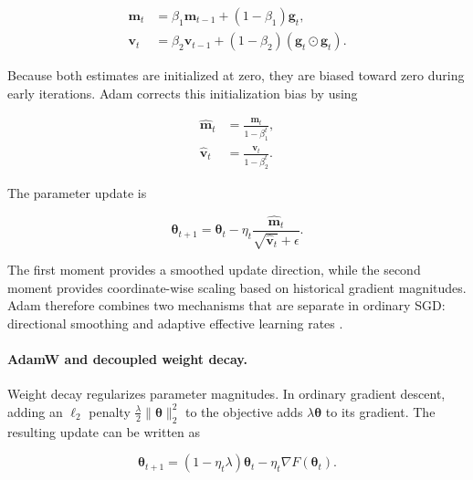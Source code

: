 \begin{align}
    \mathbf{m}_t
    &=
    \beta_1\mathbf{m}_{t-1}
    +(1-\beta_1)\mathbf{g}_t,
    \label{eq:opt-adam-first-moment}\\
    \mathbf{v}_t
    &=
    \beta_2\mathbf{v}_{t-1}
    +(1-\beta_2)(\mathbf{g}_t\odot\mathbf{g}_t).
    \label{eq:opt-adam-second-moment}
\end{align}

Because both estimates are initialized at zero, they are biased toward
zero during early iterations. Adam corrects this initialization bias by
using

\begin{align}
    \widehat{\mathbf{m}}_t
    &=
    \frac{\mathbf{m}_t}{1-\beta_1^t},
    \label{eq:opt-adam-mhat}\\
    \widehat{\mathbf{v}}_t
    &=
    \frac{\mathbf{v}_t}{1-\beta_2^t}.
    \label{eq:opt-adam-vhat}
\end{align}

The parameter update is

\begin{equation}
    \boldsymbol{\theta}_{t+1}
    =
    \boldsymbol{\theta}_t
    -
    \eta_t
    \frac{\widehat{\mathbf{m}}_t}
    {\sqrt{\widehat{\mathbf{v}}_t}+\epsilon}.
    \label{eq:opt-adam-update}
\end{equation}

The first moment provides a smoothed update direction, while the second
moment provides coordinate-wise scaling based on historical gradient
magnitudes. Adam therefore combines two mechanisms that are separate in
ordinary SGD: directional smoothing and adaptive effective learning
rates \parencite{Ranganath2026Navigating}.

\paragraph{AdamW and decoupled weight decay.}
Weight decay regularizes parameter magnitudes. In ordinary gradient
descent, adding an $\ell_2$ penalty
$\frac{\lambda}{2}\|\boldsymbol{\theta}\|_2^2$ to the objective adds
$\lambda\boldsymbol{\theta}$ to its gradient. The resulting update can
be written as

\begin{equation}
    \boldsymbol{\theta}_{t+1}
    =
    (1-\eta_t\lambda)\boldsymbol{\theta}_t
    -
    \eta_t\nabla F(\boldsymbol{\theta}_t).
    \label{eq:opt-l2-decay-sgd}
\end{equation}


